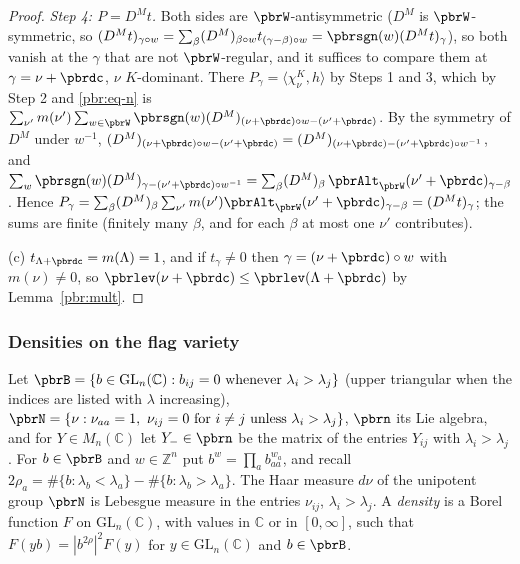 \documentclass[10pt]{amsart}
\theoremstyle{definition}
\theoremstyle{remark}
\newcommand{\C}{\mathbb C}
\newcommand{\Z}{\mathbb Z}
\begin{document}
\begin{proof}
\emph{Step 4: $P=D^Mt$.} Both sides are $\pbrW$-antisymmetric ($D^M$ is $\pbrW$-symmetric, so
$(D^Mt)_{\gamma\circ w}=\sum_\beta(D^M)_{\beta\circ w}t_{(\gamma-\beta)\circ w}=\pbrsgn(w)(D^Mt)_\gamma$),
so both vanish at the $\gamma$ that are not $\pbrW$-regular, and it suffices to compare them at
$\gamma=\nu+\pbrdc$, $\nu$ $K$-dominant. There $P_\gamma=\langle\chi^K_\nu,h\rangle$ by Steps 1 and 3,
which by Step 2 and \eqref{pbr:eq-n} is $\sum_{\nu'}m(\nu')\sum_{w\in\pbrW}\pbrsgn(w)(D^M)_{(\nu+
\pbrdc)\circ w-(\nu'+\pbrdc)}$. By the symmetry of $D^M$ under $w^{-1}$,
$(D^M)_{(\nu+\pbrdc)\circ w-(\nu'+\pbrdc)}=(D^M)_{(\nu+\pbrdc)-(\nu'+\pbrdc)\circ w^{-1}}$, and
$\sum_{w}\pbrsgn(w)(D^M)_{\gamma-(\nu'+\pbrdc)\circ w^{-1}}=\sum_\beta(D^M)_\beta\,\pbrAlt_{\pbrW}
(\nu'+\pbrdc)_{\gamma-\beta}$. Hence $P_\gamma=\sum_\beta(D^M)_\beta\sum_{\nu'}m(\nu')\pbrAlt_{\pbrW}
(\nu'+\pbrdc)_{\gamma-\beta}=(D^Mt)_\gamma$; the sums are finite (finitely many $\beta$, and for each
$\beta$ at most one $\nu'$ contributes).

(c) $t_{\Lambda+\pbrdc}=m(\Lambda)=1$, and if $t_\gamma\ne0$ then $\gamma=(\nu+\pbrdc)\circ w$ with
$m(\nu)\ne0$, so $\pbrlev(\nu+\pbrdc)\le\pbrlev(\Lambda+\pbrdc)$ by Lemma~\ref{pbr:mult}.
\end{proof}

\subsubsection{Densities on the flag variety}\label{pbr:ss-flag}

Let $\pbrB=\{b\in\mathrm{GL}_n(\C):b_{ij}=0\text{ whenever }\lambda_i>\lambda_j\}$ (upper triangular
when the indices are listed with $\lambda$ increasing), $\pbrN=\{\nu:\nu_{aa}=1,\ \nu_{ij}=0\text{ for
}i\ne j\text{ unless }\lambda_i>\lambda_j\}$, $\pbrn$ its Lie algebra, and for $Y\in M_n(\C)$ let
$Y_-\in\pbrn$ be the matrix of the entries $Y_{ij}$ with $\lambda_i>\lambda_j$. For $b\in\pbrB$ and
$w\in\Z^n$ put $b^w=\prod_ab_{aa}^{w_a}$, and recall $2\rho_a=\#\{b:\lambda_b<\lambda_a\}-\#\{b:
\lambda_b>\lambda_a\}$. The Haar measure $d\nu$ of the unipotent group $\pbrN$ is Lebesgue measure in
the entries $\nu_{ij}$, $\lambda_i>\lambda_j$. A \emph{density} is a Borel function $F$ on
$\mathrm{GL}_n(\C)$, with values in $\C$ or in $[0,\infty]$, such that $F(yb)=|b^{2\rho}|^2F(y)$ for
$y\in\mathrm{GL}_n(\C)$ and $b\in\pbrB$.
\end{document}
